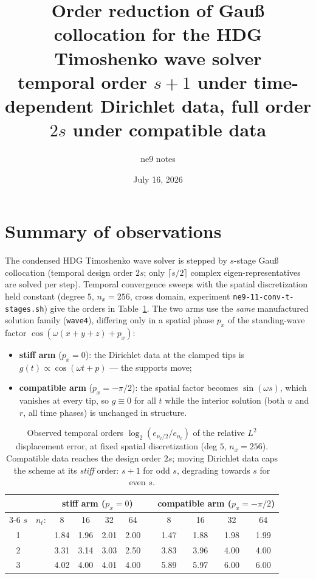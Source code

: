\documentclass[11pt,a4paper]{article}
\title{Order reduction of Gau{\ss} collocation for the HDG Timoshenko wave solver\\
  \large temporal order $s{+}1$ under time-dependent Dirichlet data,
  full order $2s$ under compatible data}
\author{ne9 notes}
\date{July 16, 2026}
\begin{document}
\maketitle

\section{Summary of observations}

The condensed HDG Timoshenko wave solver is stepped by $s$-stage Gau{\ss}
collocation (temporal design order $2s$; only $\lceil s/2\rceil$ complex
eigen-representatives are solved per step). Temporal convergence sweeps with the
spatial discretization held constant (degree $5$, $n_x = 256$, cross domain,
experiment \texttt{ne9-11-conv-t-stages.sh}) give the orders in
Table~\ref{tab:orders}. The two arms use the \emph{same} manufactured solution
family (\texttt{wave4}), differing only in a spatial phase $p_x$ of the
standing-wave factor $\cos(\omega(x{+}y{+}z) + p_x)$:
\begin{itemize}
  \item \textbf{stiff arm} ($p_x = 0$): the Dirichlet data at the clamped tips is
    $g(t) \propto \cos(\omega t + p)$ --- the supports move;
  \item \textbf{compatible arm} ($p_x = -\pi/2$): the spatial factor becomes
    $\sin(\omega s)$, which vanishes at every tip, so $g \equiv 0$ for all $t$
    while the interior solution (both $u$ and $r$, all time phases) is unchanged
    in structure.
\end{itemize}

\begin{table}[h]\centering
\begin{tabular}{c c cccc c cccc}
\toprule
 & & \multicolumn{4}{c}{stiff arm ($p_x = 0$)} & \phantom{x}
   & \multicolumn{4}{c}{compatible arm ($p_x = -\pi/2$)} \\
\cmidrule{3-6}\cmidrule{8-11}
$s$ & $n_t$: & 8 & 16 & 32 & 64 & & 8 & 16 & 32 & 64 \\
\midrule
1 & & 1.84 & 1.96 & 2.01 & 2.00 & & 1.47 & 1.88 & 1.98 & 1.99 \\
2 & & 3.31 & 3.14 & 3.03 & 2.50 & & 3.83 & 3.96 & 4.00 & 4.00 \\
3 & & 4.02 & 4.00 & 4.01 & 4.00 & & 5.89 & 5.97 & 6.00 & 6.00 \\
\bottomrule
\end{tabular}
\caption{Observed temporal orders $\log_2(e_{n_t/2}/e_{n_t})$ of the relative
  $L^2$ displacement error, at fixed spatial discretization (deg $5$,
  $n_x = 256$). Compatible data reaches the design order $2s$; moving Dirichlet
  data caps the scheme at its \emph{stiff} order: $s{+}1$ for odd $s$, degrading
  towards $s$ for even $s$.}
\label{tab:orders}
\end{table}
\end{document}
